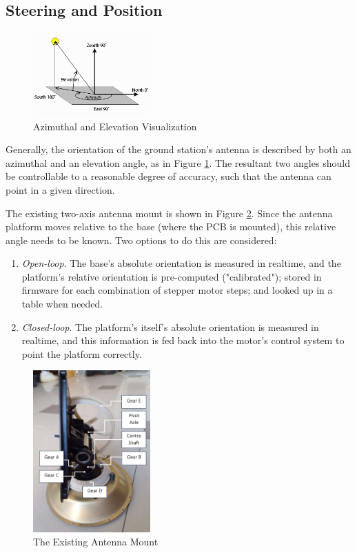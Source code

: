 \subsection{Steering and Position}\label{sec:gs_steering_positioning}
\begin{figure}[!htb]
    \centering
    \includegraphics[width=0.4\textwidth]{az_elevation}
    \caption{Azimuthal and Elevation Visualization \cite{site-azElevationVisual}}
    \label{fig:az_elevation}
\end{figure}

Generally, the orientation of the ground station's antenna is described by both an azimuthal and an elevation angle, as in Figure \ref{fig:az_elevation}. The resultant two angles should be controllable to a reasonable degree of accuracy, such that the antenna can point in a given direction.

The existing two-axis antenna mount is shown in Figure \ref{fig:antennaMount}. Since the antenna platform moves relative to the base (where the PCB is mounted), this relative angle needs to be known. Two options to do this are considered:
\begin{enumerate}
    \item \textit{Open-loop}. The base's absolute orientation is measured in realtime, and the platform's relative orientation is pre-computed ("calibrated"); stored in firmware for each combination of stepper motor steps; and looked up in a table when needed.
    \item \textit{Closed-loop}. The platform's itself's absolute orientation is measured in realtime, and this information is fed back into the motor's control system to point the platform correctly.
\end{enumerate}

\begin{figure}[!htb]
    \centering
    \includegraphics[width=0.4\textwidth]{antennaMount}
    \caption{The Existing Antenna Mount}
    \label{fig:antennaMount}
\end{figure}


